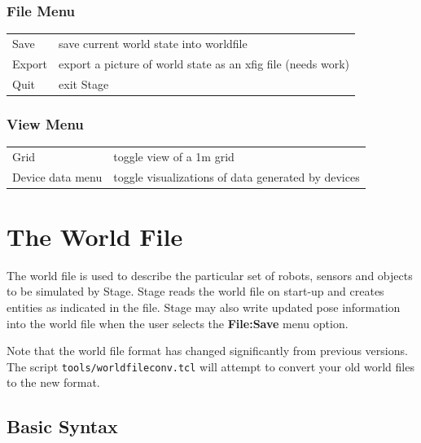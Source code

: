 \documentclass[11pt,twoside]{report}
\begin{document}
\subsection{File Menu}

\begin{tabular}{|l|l|}
\hline 
Save & save current world state into worldfile\\
Export & export a picture of world state as an xfig file (needs work)\\
Quit & exit Stage\\
\hline
\end{tabular}

\subsection{View Menu}

\begin{tabular}{|l|l|}
\hline 
Grid & toggle view of a 1m grid\\
Device data menu & toggle visualizations of data generated by devices\\
\hline
\end{tabular}


\chapter{The World File}
\label{sec:world}

The world file is used to describe the particular set of robots,
sensors and objects to be simulated by Stage.  Stage reads the world
file on start-up and creates entities as indicated in the file.  Stage
may also write updated pose information into the world file when the
user selects the {\bf File:Save} menu option.

Note that the world file format has changed significantly from
previous versions. The script \verb+tools/worldfileconv.tcl+ will
attempt to convert your old world files to the new format.

\section{Basic Syntax}
\end{document}
